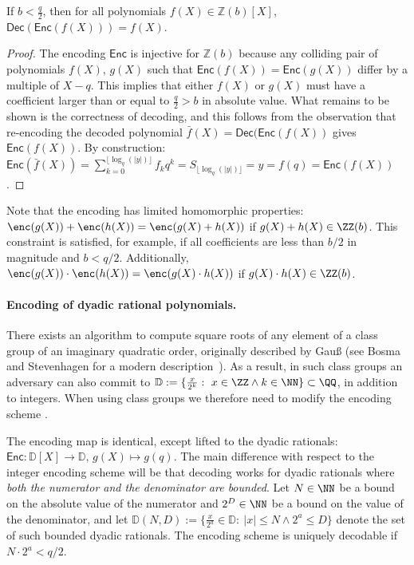 \begin{lemma}
If $b < \frac{q}{2}$, then for all polynomials $f(X) \in \mathbb{Z}(b)[X]$, $\mathsf{Dec}(\mathsf{Enc}(f(X))) = f(X)$.
\end{lemma}

\begin{proof}
The encoding $\mathsf{Enc}$ is injective for $\mathbb{Z}(b)$ because any colliding pair of polynomials $f(X)$, $g(X)$ such that $\mathsf{Enc}(f(X)) = \mathsf{Enc}(g(X))$ differ by a multiple of $X-q$. This implies that either $f(X)$ or $g(X)$ must have a coefficient larger than or equal to $\frac{q}{2} > b$ in absolute value. What remains to be shown is the correctness of decoding, and this follows from the observation that re-encoding the decoded polynomial $\bar{f}(X) = \mathsf{Dec}(\mathsf{Enc}(f(X))$ gives $\mathsf{Enc}(f(X))$. By construction: $\mathsf{Enc}(\bar{f}(X)) = \sum_{k=0}^{\lfloor \log_q(|y|) \rfloor} f_k q^k = S_{\lfloor \log_q (|y|) \rfloor} = y = f(q) = \mathsf{Enc}(f(X))$.
\end{proof}

Note that the encoding has limited homomorphic properties: $\enc(g(X))+\enc(h(X))=\enc(g(X)+h(X))$ if $g(X)+h(X)\in \ZZ(b)$. This constraint is satisfied, for example, if all coefficients are less than $b/2$ in magnitude and $b < q/2$. Additionally, $\enc(g(X))\cdot \enc(h(X))=\enc(g(X)\cdot h(X))$ if $g(X)\cdot h(X)\in \ZZ(b)$.

\paragraph{Encoding of dyadic rational polynomials.}
There exists an algorithm to compute square roots of any element of a class group of an imaginary quadratic order, originally described by Gauß (see Bosma and Stevenhagen for a modern description~\cite{jtn/BosSte96}). As a result, in such class groups an adversary can also commit to  $\mathbb{D}:=\{\frac{x}{2^k} : \ x \in \ZZ \wedge k \in \NN\}\subset \QQ$, in addition to integers. When using class groups we therefore need to modify the encoding scheme . 

The encoding map is identical, except lifted to the dyadic rationals: $\mathsf{Enc} : \mathbb{D}[X] \rightarrow \mathbb{D}, \, g(X) \mapsto g(q)$. The main difference with respect to the integer encoding scheme will be that decoding works for dyadic rationals where \emph{both the numerator and the denominator are bounded}. Let $N \in \NN$ be a bound on the absolute value of the numerator and $2^D\in \NN$ be a bound on the value of the denominator, and let $\mathbb{D}(N, D) :=\{\frac{x}{2^a} \in \mathbb{D} : \ |x|\leq N \wedge 2^a \leq D\}$ denote the set of such bounded dyadic rationals. The encoding scheme is uniquely decodable if $N \cdot 2^a < q/2$.
 
